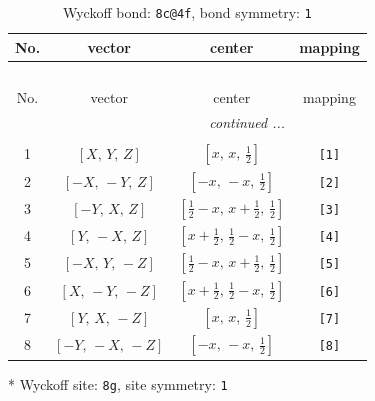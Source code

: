 \documentclass[fleqn,8pt]{jsarticle}
\begin{document}
\renewcommand{\arraystretch}{1.2}
\begin{longtable}{cccc}
\caption{Wyckoff bond: {\tt 8c@4f}, bond symmetry: {\tt 1}}
 \\
 \hline \hline
No. & vector & center & mapping \\ \hline \endfirsthead

\multicolumn{3}{l}{\tablename\ \thetable{}} \\
 \hline \hline
No. & vector & center & mapping \\ \hline \endhead

 \hline \hline
\multicolumn{3}{r}{\footnotesize\it continued ...} \\ \endfoot

 \hline \hline
\multicolumn{3}{r}{} \\ \endlastfoot

1 & $\left[ X,\, Y,\, Z \right]$ & $\left[ x,\, x,\, \frac{1}{2} \right]$ & {\tt [1]} \\ \hline
2 & $\left[ - X,\, - Y,\, Z \right]$ & $\left[ - x,\, - x,\, \frac{1}{2} \right]$ & {\tt [2]} \\ \hline
3 & $\left[ - Y,\, X,\, Z \right]$ & $\left[ \frac{1}{2} - x,\, x + \frac{1}{2},\, \frac{1}{2} \right]$ & {\tt [3]} \\ \hline
4 & $\left[ Y,\, - X,\, Z \right]$ & $\left[ x + \frac{1}{2},\, \frac{1}{2} - x,\, \frac{1}{2} \right]$ & {\tt [4]} \\ \hline
5 & $\left[ - X,\, Y,\, - Z \right]$ & $\left[ \frac{1}{2} - x,\, x + \frac{1}{2},\, \frac{1}{2} \right]$ & {\tt [5]} \\ \hline
6 & $\left[ X,\, - Y,\, - Z \right]$ & $\left[ x + \frac{1}{2},\, \frac{1}{2} - x,\, \frac{1}{2} \right]$ & {\tt [6]} \\ \hline
7 & $\left[ Y,\, X,\, - Z \right]$ & $\left[ x,\, x,\, \frac{1}{2} \right]$ & {\tt [7]} \\ \hline
8 & $\left[ - Y,\, - X,\, - Z \right]$ & $\left[ - x,\, - x,\, \frac{1}{2} \right]$ & {\tt [8]} \\
\end{longtable}
* Wyckoff site: {\tt 8g}, site symmetry: {\tt 1}
\renewcommand{\arraystretch}{1.2}
\end{document}
